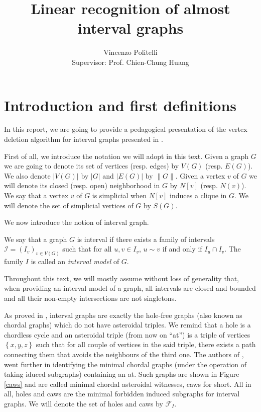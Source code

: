 \documentclass{article}
\title{Linear recognition of almost interval graphs}
\author{Vincenzo Politelli \\ Supervisor: Prof. Chien-Chung Huang}
\date{}
\begin{document}
    \maketitle
    
    \section{Introduction and first definitions}
   
    In this report,
    we are going to provide
    a pedagogical presentation
    of the vertex deletion algorithm
    for interval graphs presented in \cite{main}.
    
    First of all, 
    we introduce the notation we will
    adopt in this text.
    Given a graph $G$ we
    are going to denote
    its set of vertices (resp. edges)
    by $V\left(G\right)$
    (resp. $E\left(G\right)$).
    We also denote $\left|V\left(G\right)\right|$ 
    by $\left|G\right|$ and
    $\left|E\left(G\right)\right|$
    by $\|G\|$.
    Given a vertex $v$ of
    $G$ we will denote its
    closed (resp. open)
    neighborhood in $G$ 
    by $N\left[v\right]$ 
    (resp. $N\left(v\right)$).
    We say that a vertex
    $v$ of $G$ is simplicial
    when $N\left[v\right]$ 
    induces a clique in $G$.
    We will denote the set
    of simplicial vertices of $G$ 
    by $S\left(G\right)$.

    We now introduce the 
    notion of interval graph.

    \begin{defn}
        We say that a graph $G$
        is interval if there 
        exists a family of intervals
        $\mathcal{I} = \left(I_{v}\right)_{v \in V\left(G\right)}$
         such that
         for all $u, v \in I_{v}$,
         $u \sim v$ if and only if
         $I_{u} \cap I_{v}$.
         The family $I$ is called
         an \emph{interval model}
         of $G$.
    \end{defn}

    Throughout this text,
    we will mostly assume
    without loss of generality
    that, when providing
    an interval model of a graph,
    all intervals are closed
    and bounded and all their
    non-empty intersections
    are not singletons.

    As proved in \cite{holes-caws},
    interval graphs
    are exactly
    the hole-free graphs
    (also known as chordal graphs)
    which do not have
    asteroidal triples.
    We remind that a hole is a
    chordless cycle and an
    asteroidal triple (from 
    now on ``at'')
    is a triple of vertices
    $\left\{x, y, z\right\}$ 
    such that for all
    couple of vertices in
    the said triple, 
    there exists a path
    connecting them
    that avoids the neighbours
    of the third one.
    The authors of \cite{holes-caws},
    went further in identifying
    the minimal chordal graphs
    (under the operation
    of taking iduced subgraphs)
    containing an at.
    Such graphs are shown in
    Figure \ref{caws} and are called
    minimal chordal asteroidal
    witnesses, caws for short.
    All in all, holes and caws
    are the minimal forbidden
    induced subgraphs for 
    interval graphs.
    We will denote the set of
    holes and caws by $\mathcal{F}_{I}$.
\end{document}
